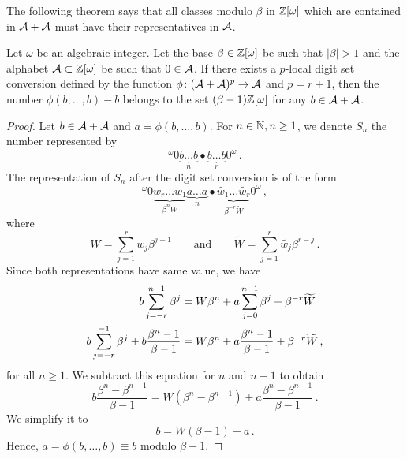 The following theorem says that all classes modulo $\beta$ in $\mathbb{Z}[\omega]$ which are contained in $\mathcal{A}+\mathcal{A}$ must have their representatives in $\mathcal{A}$.
\begin{thm}
\label{thm:reprBetaMinusOne}
Let $\omega$ be an algebraic integer. Let the base $\beta\in\mathbb{Z}[\omega]$ be such that $|\beta|>1$ and the alphabet $\mathcal{A}\subset\mathbb{Z}[\omega]$ be such that $0\in\mathcal{A}$. If there exists a $p$-local digit set conversion defined by the function $\phi\colon (\mathcal{A}+\mathcal{A})^p\rightarrow \mathcal{A}$ and $p=r+1$, then the number $\phi(b,\dots,b)-b$ belongs to the set $(\beta-1)\mathbb{Z}[\omega]$ for any $b\in\mathcal{A}+\mathcal{A}$. 
\end{thm}
\begin{proof}
Let $b\in\mathcal{A}+\mathcal{A}$ and $a=\phi(b, \dots,b)$. For $n\in\mathbb{N}, n\geq 1$, we denote $S_n$ the number represented by
$$
^{\omega}\!0 \underbrace{b\dots b}_{n}\bullet \underbrace{b\dots b}_{r}0^\omega\,.
$$
The representation of $S_n$ after the digit set conversion is of the form
$$
^{\omega}\!0 \underbrace{w_{r}\dots w_{1}}_{\beta^n W}\underbrace{a\dots a}_{n}\bullet \underbrace{\widetilde{w_1}\dots \widetilde{w_r}}_{\beta^{-r}\widetilde{W}}0^\omega\,,
$$
where 
$$W=\sum_{j=1}^r w_j \beta^{j-1} \qquad \text{and} \qquad \widetilde{W}=\sum_{j=1}^r\widetilde{w_j} \beta^{r-j}\,.$$
Since both representations have same value, we have
\begin{align}
\label{eq:reprBetaMinusOne}
b \sum_{j=-r}^{n-1} \beta^j &= W \beta^n + a \sum_{j=0}^{n-1} \beta^j + \beta^{-r}\widetilde{W} \notag \\
b \sum_{j=-r}^{-1} \beta^j +b\frac{\beta^n-1}{\beta-1} &= W \beta^n + a \frac{\beta^n-1}{\beta-1} + \beta^{-r}\widetilde{W}\,,
\end{align}
for all $n\geq 1$. We subtract this equation for $n$ and $n-1$ to obtain
$$
b\frac{\beta^n-\beta^{n-1}}{\beta-1}=W(\beta^n-\beta^{n-1}) + a\frac{\beta^n-\beta^{n-1}}{\beta-1}\,.
$$
We simplify it to
\begin{equation}
\label{eq:reprBetaMinusOneFinal}
b=W(\beta-1) + a\,.
\end{equation}
Hence, $a=\phi(b, \dots,b)\equiv b$ modulo $\beta-1$.
\end{proof}


